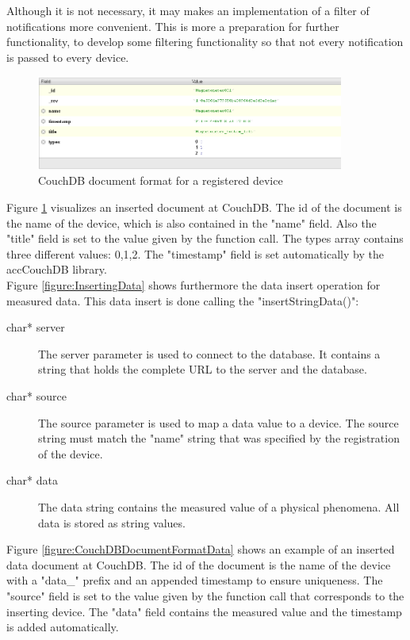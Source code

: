 Although it is not necessary, it may makes an implementation of a filter of notifications more convenient. This is more a preparation for further functionality, to develop some filtering functionality so that not every notification is passed to every device. \\

\begin{figure}[h!]
  \centering
      \includegraphics[width=0.9\textwidth]{images/CouchDBDoc_Register.png}
  \caption{CouchDB document format for a registered device}
  \label{figure:CouchDBDocumentFormat}
\end{figure}

Figure \ref{figure:CouchDBDocumentFormat} visualizes an inserted document at CouchDB. The id of the document is the name of the device, which is also contained in the "name" field. Also the "title" field is set to the value given by the function call. The types array contains three different values: 0,1,2. The "timestamp" field is set automatically by the accCouchDB library. \\

Figure \ref{figure:InsertingData} shows furthermore the data insert operation for measured data. This data insert is done calling the "insertStringData()":
\begin{description}
\item[char* server] The server parameter is used to connect to the database. It contains a string that holds the complete URL to the server and the database.
\item[char* source] The source parameter is used to map a data value to a device. The source string must match the "name" string that was specified by the registration of the device. 
\item[char* data] The data string contains the measured value of a physical phenomena. All data is stored as string values. 
\end{description}

Figure \ref{figure:CouchDBDocumentFormatData} shows an example of an inserted data document at CouchDB. The id of the document is the name of the device with a "data\_" prefix and an appended timestamp to ensure uniqueness. The "source" field is set to the value given by the function call that corresponds to the inserting device. The "data" field contains the measured value and the timestamp is added automatically.


